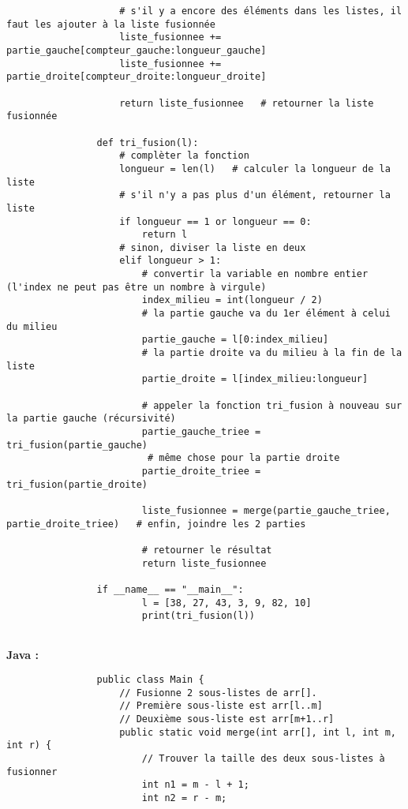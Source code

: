 \begin{Exercice} [20 minutes]
\begin{verbatim}
                    # s'il y a encore des éléments dans les listes, il faut les ajouter à la liste fusionnée
                    liste_fusionnee += partie_gauche[compteur_gauche:longueur_gauche]
                    liste_fusionnee += partie_droite[compteur_droite:longueur_droite]
                    
                    return liste_fusionnee   # retourner la liste fusionnée
                
                def tri_fusion(l):
                    # complèter la fonction
                    longueur = len(l)   # calculer la longueur de la liste
                    # s'il n'y a pas plus d'un élément, retourner la liste
                    if longueur == 1 or longueur == 0:
                        return l
                    # sinon, diviser la liste en deux
                    elif longueur > 1:
                        # convertir la variable en nombre entier (l'index ne peut pas être un nombre à virgule)
                        index_milieu = int(longueur / 2)   
                        # la partie gauche va du 1er élément à celui du milieu
                        partie_gauche = l[0:index_milieu] 
                        # la partie droite va du milieu à la fin de la liste
                        partie_droite = l[index_milieu:longueur]   
                        
                        # appeler la fonction tri_fusion à nouveau sur la partie gauche (récursivité)
                        partie_gauche_triee = tri_fusion(partie_gauche)
                         # même chose pour la partie droite
                        partie_droite_triee = tri_fusion(partie_droite)  
                        
                        liste_fusionnee = merge(partie_gauche_triee, partie_droite_triee)   # enfin, joindre les 2 parties
                        
                        # retourner le résultat
                        return liste_fusionnee   
                
                if __name__ == "__main__":
                        l = [38, 27, 43, 3, 9, 82, 10]
                        print(tri_fusion(l))
    
            \end{verbatim}
            \textbf{Java :}
            \begin{verbatim}
                public class Main {
                    // Fusionne 2 sous-listes de arr[]. 
                    // Première sous-liste est arr[l..m] 
                    // Deuxième sous-liste est arr[m+1..r] 
                    public static void merge(int arr[], int l, int m, int r) {
                        // Trouver la taille des deux sous-listes à fusionner
                        int n1 = m - l + 1; 
                        int n2 = r - m; 
                  

\end{verbatim}
\end{Exercice}
